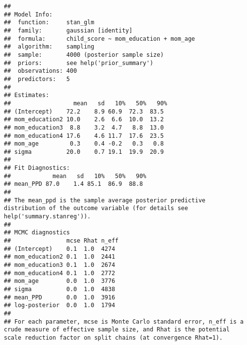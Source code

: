 \documentclass[
]{article}
\begin{document}
\begin{verbatim}
## 
## Model Info:
##  function:     stan_glm
##  family:       gaussian [identity]
##  formula:      child_score ~ mom_education + mom_age
##  algorithm:    sampling
##  sample:       4000 (posterior sample size)
##  priors:       see help('prior_summary')
##  observations: 400
##  predictors:   5
## 
## Estimates:
##                  mean   sd   10%   50%   90%
## (Intercept)    72.2    8.9 60.9  72.3  83.5 
## mom_education2 10.0    2.6  6.6  10.0  13.2 
## mom_education3  8.8    3.2  4.7   8.8  13.0 
## mom_education4 17.6    4.6 11.7  17.6  23.5 
## mom_age         0.3    0.4 -0.2   0.3   0.8 
## sigma          20.0    0.7 19.1  19.9  20.9 
## 
## Fit Diagnostics:
##            mean   sd   10%   50%   90%
## mean_PPD 87.0    1.4 85.1  86.9  88.8 
## 
## The mean_ppd is the sample average posterior predictive distribution of the outcome variable (for details see help('summary.stanreg')).
## 
## MCMC diagnostics
##                mcse Rhat n_eff
## (Intercept)    0.1  1.0  4274 
## mom_education2 0.1  1.0  2441 
## mom_education3 0.1  1.0  2674 
## mom_education4 0.1  1.0  2772 
## mom_age        0.0  1.0  3776 
## sigma          0.0  1.0  4838 
## mean_PPD       0.0  1.0  3916 
## log-posterior  0.0  1.0  1794 
## 
## For each parameter, mcse is Monte Carlo standard error, n_eff is a crude measure of effective sample size, and Rhat is the potential scale reduction factor on split chains (at convergence Rhat=1).
\end{verbatim}
\end{document}
